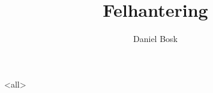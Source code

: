 \documentclass[ignoreframetext]{beamer}
\begin{document}
\title{%
  Felhantering
}
\author{Daniel Bosk}

\begin{frame}
  \maketitle
\end{frame}

\mode<all>

\mode*
%

\end{document}
